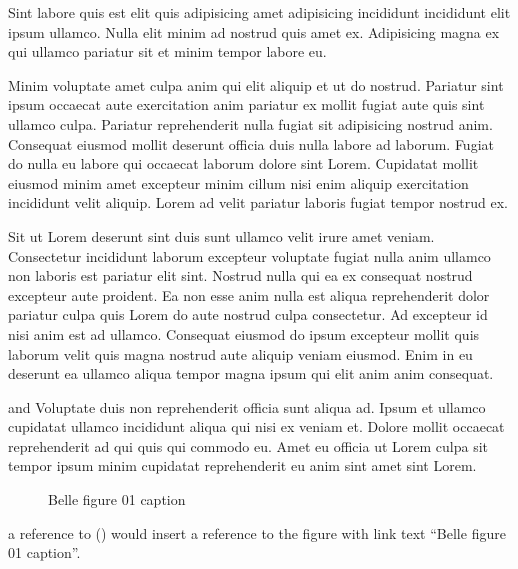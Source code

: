 \documentclass[a4paper,10pt,french]{sphinxmanual}
\let\sphinxpxdimen\pdfpxdimen\else\newdimen\sphinxpxdimen
\begin{document}
Sint labore quis est elit quis adipisicing amet adipisicing incididunt incididunt elit ipsum ullamco. Nulla elit minim ad nostrud quis amet ex. Adipisicing magna ex qui ullamco pariatur sit et minim tempor labore eu.

Minim voluptate amet culpa anim qui elit aliquip et ut do nostrud. Pariatur sint ipsum occaecat aute exercitation anim pariatur ex mollit fugiat aute quis sint ullamco culpa. Pariatur reprehenderit nulla fugiat sit adipisicing nostrud anim. Consequat eiusmod mollit deserunt officia duis nulla labore ad laborum. Fugiat do nulla eu labore qui occaecat laborum dolore sint Lorem. Cupidatat mollit eiusmod minim amet excepteur minim cillum nisi enim aliquip exercitation incididunt velit aliquip. Lorem ad velit pariatur laboris fugiat tempor nostrud ex.

Sit ut Lorem deserunt sint duis sunt ullamco velit irure amet veniam. Consectetur incididunt laborum excepteur voluptate fugiat nulla anim ullamco non laboris est pariatur elit sint. Nostrud nulla qui ea ex consequat nostrud excepteur aute proident. Ea non esse anim nulla est aliqua reprehenderit dolor pariatur culpa quis Lorem do aute nostrud culpa consectetur. Ad excepteur id nisi anim est ad ullamco. Consequat eiusmod do ipsum excepteur mollit quis laborum velit quis magna nostrud aute aliquip veniam eiusmod. Enim in eu deserunt ea ullamco aliqua tempor magna ipsum qui elit anim anim consequat.

 and  Voluptate  duis non reprehenderit officia sunt aliqua ad. Ipsum et ullamco cupidatat ullamco incididunt aliqua qui nisi ex veniam et. Dolore mollit occaecat reprehenderit ad qui quis qui commodo eu. Amet eu officia ut Lorem culpa sit tempor ipsum minim cupidatat reprehenderit eu anim sint amet sint Lorem.
\begin{figure}[htbp]
\centering
\capstart

\noindent\sphinxincludegraphics[height=400\sphinxpxdimen]{{stock-photo-195880277}.jpg}
\caption{Belle figure 01 caption}\label{\detokenize{docs/tuts/autocad-tut01:my-figure}}\label{\detokenize{docs/tuts/autocad-tut01:id23}}\end{figure}

a reference to {\hyperref[\detokenize{docs/tuts/autocad-tut01:my-figure}]{}} () would insert a reference to the figure with link text “Belle figure 01 caption”.
\end{document}
